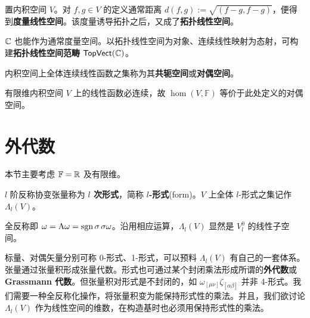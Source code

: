 \begin{definition}
    置内积空间 $V$。对 $f,g\in V$ 的定义通常距离 $d(f, g):=\sqrt{(f-g, f-g)}$，便得到\textbf{度量线性空间}。该度量诱导拓扑之后，又成了\textbf{拓扑线性空间}。
\end{definition}

$\mathbb{C}$ 也能作为通常度量空间。以拓扑线性空间为对象、连续线性映射为态射，可构建\textbf{拓扑线性空间范畴} $\mathsf{TopVect}(\mathbb C)$。

\begin{definition}
    内积空间上全体连续线性函数之集称为其\textbf{共轭空间}或\textbf{对偶空间}。
\end{definition}
\begin{remark}
    有限维内积空间 $V$ 上的线性函数必连续，故 $\hom(V,\mathbb F)$ 等价于此处定义的对偶空间。
\end{remark}




\section{外代数}

本节主要考虑 $\mathbb F=\mathbb{R}$ 及有限维。

\begin{definition}
    $l$ 阶反称协变张量称为 \textbf{$l$ 次形式}，简称 \textbf{$l$-形式}(form)。$V$ 上全体 $l$-形式之集记作 $\Lambda_l(V)$。
\end{definition}
\begin{remark}
    全反称即 $\omega=\mathrm{A}\omega=\operatorname{sgn}\sigma\,\sigma\omega$。沿用相应运算，$\Lambda_l(V)$ 显然是 $V^0_l$ 的线性子空间。
\end{remark}

标量、对偶矢量分别可称 0-形式、1-形式，可以预料 $\Lambda_l(V)$ 有自己的一套体系。张量通过张量积形成张量代数。形式也可通过某个封闭乘法形成所谓的\textbf{外代数}或 \textbf{Grassmann 代数}。但张量积对形式是不封闭的，如 $\omega_{[\mu\nu]}\zeta_{[\alpha\beta]}$ 并非 4-形式。我们需要一种全反称化操作，将张量积变为能保持形式性的乘法。并且，我们欲讨论 $\Lambda_l(V)$ 作为线性空间的维数，在构造基时也必须用保持形式性的乘法。

